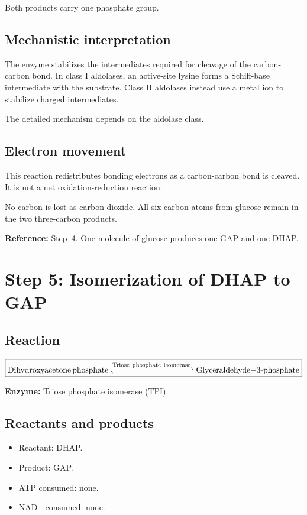 \documentclass[11pt,a4paper]{article}
\newcommand{\stepref}[1]{\hyperref[step:#1]{Step~#1}}
\newcommand{\Enz}[1]{\textbf{Enzyme:} #1}
\newcommand{\Note}[1]{\par\smallskip
  \noindent\colorbox{gray!12}{
    \parbox{0.96\linewidth}{#1}
  }\par\smallskip}
\begin{document}
Both products carry one phosphate group.

\subsection{Mechanistic interpretation}

The enzyme stabilizes the intermediates required for cleavage of
the carbon-carbon bond. In class I aldolases, an active-site lysine
forms a Schiff-base intermediate with the substrate. Class II
aldolases instead use a metal ion to stabilize charged intermediates.

The detailed mechanism depends on the aldolase class.

\subsection{Electron movement}

This reaction redistributes bonding electrons as a carbon-carbon
bond is cleaved. It is not a net oxidation-reduction reaction.

No carbon is lost as carbon dioxide. All six carbon atoms from
glucose remain in the two three-carbon products.

\Note{
\textbf{Reference:} \stepref{4}. One molecule of glucose produces
one GAP and one DHAP.
}

\section{Step 5: Isomerization of DHAP to GAP}
\label{step:5}

\subsection{Reaction}

\[
\boxed{
\ce{
Dihydroxyacetone phosphate
<=>[Triose\ phosphate\ isomerase]
Glyceraldehyde-3-phosphate
}
}
\]

\Enz{Triose phosphate isomerase (TPI).}

\subsection{Reactants and products}

\begin{itemize}
  \item Reactant: DHAP.
  \item Product: GAP.
  \item ATP consumed: none.
  \item NAD$^+$ consumed: none.
\end{itemize}
\end{document}
